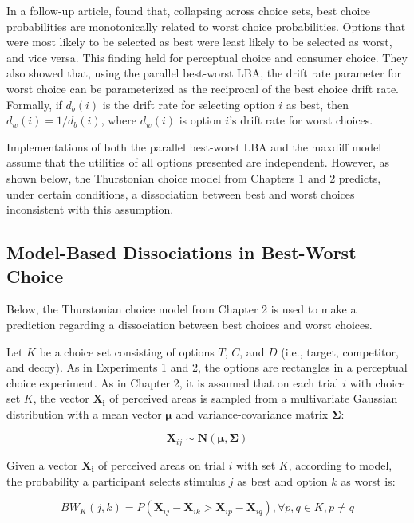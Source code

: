 In a follow-up article, \textcite{hawkinsBestTimesWorst2014} found that, collapsing across choice sets, best choice probabilities are monotonically related to worst choice probabilities. Options that were most likely to be selected as best were least likely to be selected as worst, and vice versa. This finding held for perceptual choice and consumer choice. They also showed that, using the parallel best-worst LBA, the drift rate parameter for worst choice can be parameterized as the reciprocal of the best choice drift rate. Formally, if $d_{b}(i)$ is the drift rate for selecting option $i$ as best, then $d_{w}(i)=1/d_{b}(i)$, where $d_{w}(i)$ is option $i$'s drift rate for worst choices. 

Implementations of both the parallel best-worst LBA and the maxdiff model assume that the utilities of all options presented are independent. However, as shown below, the Thurstonian choice model from Chapters 1 and 2 predicts, under certain conditions, a dissociation between best and worst choices inconsistent with this assumption.

\subsection{Model-Based Dissociations in Best-Worst Choice}

Below, the Thurstonian choice model from Chapter 2 is used to make a prediction regarding a dissociation between best choices and worst choices. 

Let $K$ be a choice set consisting of options $T$, $C$, and $D$ (i.e., target, competitor, and decoy). As in Experiments 1 and 2, the options are rectangles in a perceptual choice experiment. As in Chapter 2, it is assumed that on each trial $i$ with choice set $K$, the vector $\bm{X_{i}}$ of perceived areas is sampled from a multivariate Gaussian distribution with a mean vector $\boldsymbol{\mu}$ and variance-covariance matrix $\boldsymbol{\Sigma}$:

\begin{equation}
   \bm{X}_{ij} \sim \bm{N}(\boldsymbol{\mu},\boldsymbol{\Sigma})
   \label{eqn:bw_thurstone_dist}
\end{equation}

Given a vector $\bm{X_{i}}$ of perceived areas on trial $i$ with set $K$, according to model, the probability a participant selects stimulus $j$ as best and option $k$ as worst is:

\begin{equation}
   BW_{K}(j,k)=P(\bm{X}_{ij}-\bm{X}_{ik} > \bm{X}_{ip}-\bm{X}_{iq}), \forall p, q \in K, p \neq q
   \label{eqn:bw_thurstone_equation}
\end{equation}

